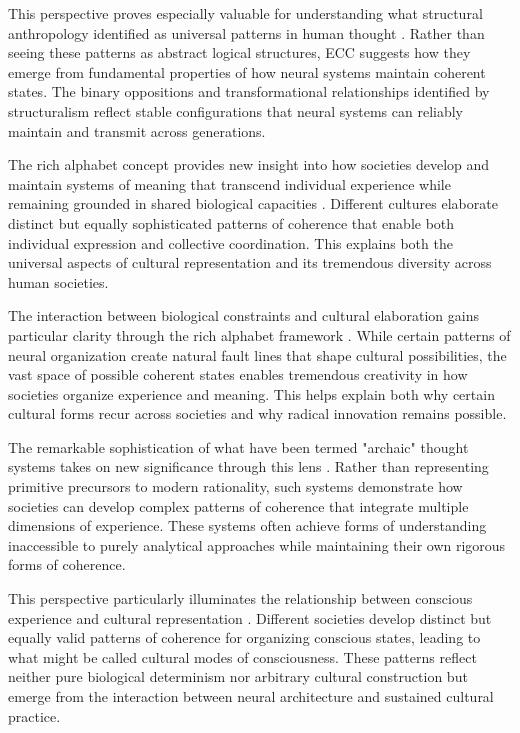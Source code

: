 This perspective proves especially valuable for understanding what structural anthropology identified as universal patterns in human thought \cite{levistrauss1963structural}. Rather than seeing these patterns as abstract logical structures, ECC suggests how they emerge from fundamental properties of how neural systems maintain coherent states. The binary oppositions and transformational relationships identified by structuralism reflect stable configurations that neural systems can reliably maintain and transmit across generations.

The rich alphabet concept provides new insight into how societies develop and maintain systems of meaning that transcend individual experience while remaining grounded in shared biological capacities \cite{rappaport1999ritual}. Different cultures elaborate distinct but equally sophisticated patterns of coherence that enable both individual expression and collective coordination. This explains both the universal aspects of cultural representation and its tremendous diversity across human societies.

The interaction between biological constraints and cultural elaboration gains particular clarity through the rich alphabet framework \cite{descola2013beyond}. While certain patterns of neural organization create natural fault lines that shape cultural possibilities, the vast space of possible coherent states enables tremendous creativity in how societies organize experience and meaning. This helps explain both why certain cultural forms recur across societies and why radical innovation remains possible.

The remarkable sophistication of what have been termed "archaic" thought systems takes on new significance through this lens \cite{turner1967forest}. Rather than representing primitive precursors to modern rationality, such systems demonstrate how societies can develop complex patterns of coherence that integrate multiple dimensions of experience. These systems often achieve forms of understanding inaccessible to purely analytical approaches while maintaining their own rigorous forms of coherence.

This perspective particularly illuminates the relationship between conscious experience and cultural representation \cite{jung1968archetypes}. Different societies develop distinct but equally valid patterns of coherence for organizing conscious states, leading to what might be called cultural modes of consciousness. These patterns reflect neither pure biological determinism nor arbitrary cultural construction but emerge from the interaction between neural architecture and sustained cultural practice.

